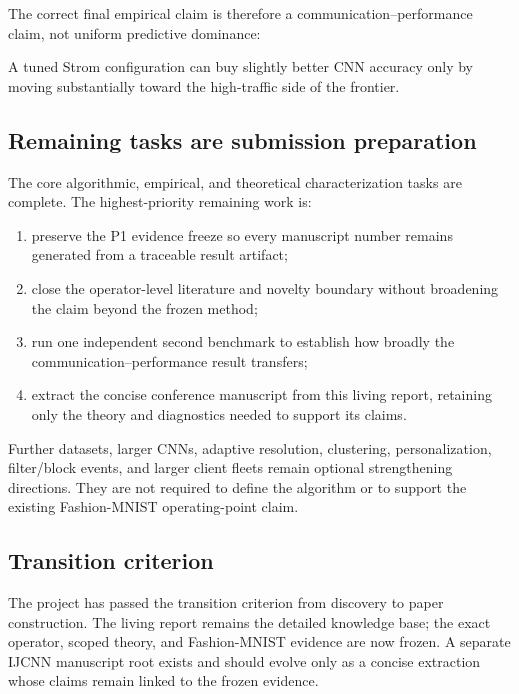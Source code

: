 The correct final empirical claim is therefore a communication--performance claim, not uniform predictive dominance:
\begin{center}
\end{center}
A tuned Strom configuration can buy slightly better CNN accuracy only by moving substantially toward the high-traffic side of the frontier.

\subsection{Remaining tasks are submission preparation}

The core algorithmic, empirical, and theoretical characterization tasks are
complete. The highest-priority remaining work is:
\begin{enumerate}
    \item preserve the P1 evidence freeze so every manuscript number remains
    generated from a traceable result artifact;
    \item close the operator-level literature and novelty boundary without
    broadening the claim beyond the frozen method;
    \item run one independent second benchmark to establish how broadly the
    communication--performance result transfers;
    \item extract the concise conference manuscript from this living report,
    retaining only the theory and diagnostics needed to support its claims.
\end{enumerate}

Further datasets, larger CNNs, adaptive resolution, clustering,
personalization, filter/block events, and larger client fleets remain optional
strengthening directions. They are not required to define the algorithm or to
support the existing Fashion-MNIST operating-point claim.

\subsection{Transition criterion}

The project has passed the transition criterion from discovery to paper construction. The living report remains the detailed knowledge base; the exact operator, scoped theory, and Fashion-MNIST evidence are now frozen. A separate IJCNN manuscript root exists and should evolve only as a concise extraction whose claims remain linked to the frozen evidence.

